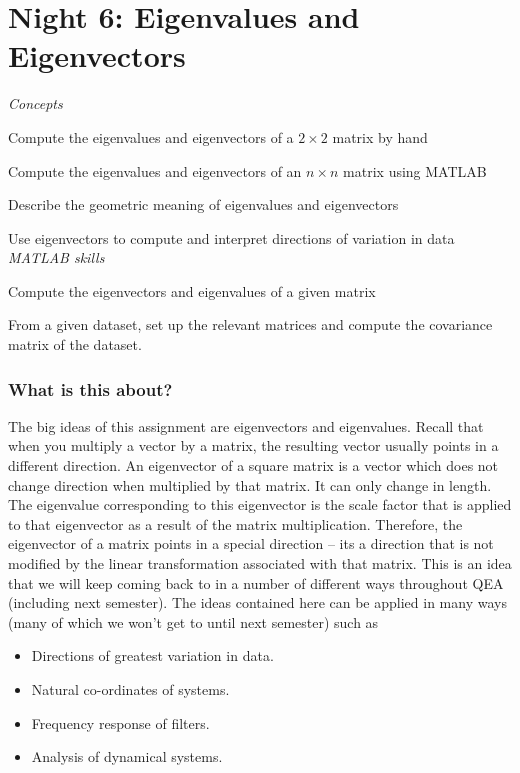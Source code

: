 \chapter{Night 6: Eigenvalues and Eigenvectors}

\begin{learningobjectives}
\emph{Concepts}
\bi
\item Compute the eigenvalues and eigenvectors of a $2\times 2$ matrix by hand
\item Compute the eigenvalues and eigenvectors of an $n \times n$ matrix using MATLAB
\item Describe the geometric meaning of eigenvalues and eigenvectors
\item Use eigenvectors to compute and interpret directions of variation in data
\ei
\emph{MATLAB skills}
\bi
\item Compute the eigenvectors and eigenvalues of a given matrix
\item From a given dataset, set up the relevant matrices and compute the covariance matrix of the dataset.
\ei
\end{learningobjectives}


\subsection{What is this about?}

The big ideas of this assignment are eigenvectors and eigenvalues. Recall that when you multiply a vector by a matrix, the resulting vector usually points in a different direction. An eigenvector of a square matrix is a vector which does not change direction when multiplied by that matrix. It can only change in length. The eigenvalue corresponding to this eigenvector is the scale factor that is applied to that eigenvector as a result of the matrix multiplication.  Therefore, the eigenvector of a matrix points in a special direction -- its a direction that is not modified by the linear transformation associated with that matrix. This is an idea that we will keep coming back to in a number of different ways throughout QEA (including next semester). The ideas contained here can be applied in many ways (many of which we won't get to until next semester) such as
\begin{itemize}
\item Directions of greatest variation in data.
\item Natural co-ordinates of systems.
\item Frequency response of filters.
\item Analysis of dynamical systems.
\end{itemize}



